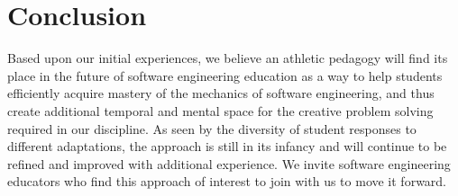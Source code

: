 \section{Conclusion}





Based upon our initial experiences, we believe an athletic pedagogy will find its place in the future of software engineering education as a way to help students efficiently acquire mastery of the mechanics of software engineering, and thus create additional temporal and mental space for the creative problem solving required in our discipline. As seen by the diversity of student responses to different adaptations, the approach is still in its infancy and will continue to be refined and improved with additional experience. We invite software engineering educators who find this approach of interest to join with us to move it forward. 

